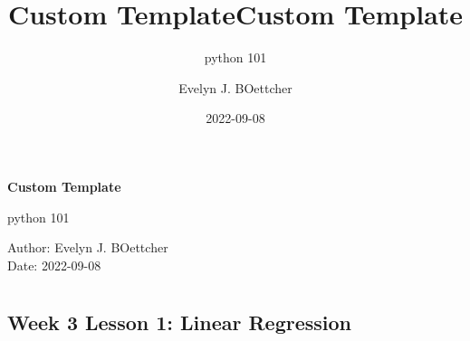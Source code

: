 \documentclass[
]{report}
\title{Custom Template}
\subtitle{python 101}
\author{Evelyn J. BOettcher}
\date{2022-09-08}
\renewcommand*\contentsname{Table of contents}
\newcommand\contentsname{Table of contents}
\begin{document}
 
  \begin{titlepage}
  
  \begin{titlepage}
  \thispagestyle{custom-fancy}
  \vspace{2cm}

  \begin{center}
    
    \Huge
    \textbf{Custom Template}
    \vspace{1cm}
   
    \huge
        python 101
      \vspace{1cm}
    \end{center}


  \vfill

  \Large
  Author: Evelyn J. BOettcher \\
  Date: 2022-09-08



  \end{titlepage}

  \title{Custom Template}  \end{titlepage}


\thispagestyle{plain} 

\ifdefined\Shaded\renewenvironment{Shaded}{\begin{tcolorbox}[frame hidden, breakable, interior hidden, sharp corners, boxrule=0pt, enhanced, borderline west={3pt}{0pt}{shadecolor}]}{\end{tcolorbox}}\fi

\renewcommand*\contentsname{Table of contents}
{
\hypersetup{linkcolor=}
\setcounter{tocdepth}{2}
\tableofcontents
}
\hypertarget{section}{%
\chapter{}\label{section}}

\hypertarget{week-3-lesson-1-linear-regression}{%
\section{Week 3 Lesson 1: Linear
Regression}\label{week-3-lesson-1-linear-regression}}
\end{document}
